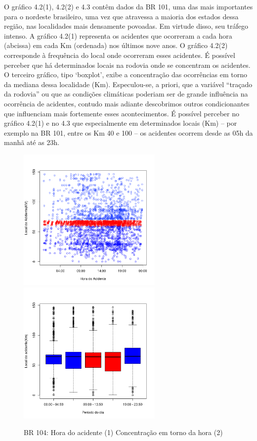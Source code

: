 O gráfico 4.2(1), 4.2(2)  e 4.3 contêm dados da BR 101, uma das mais importantes para o nordeste brasileiro, uma vez que atravessa a maioria dos estados dessa região, nas localidades mais densamente povoadas. Em virtude disso, seu tráfego intenso. 
A gráfico 4.2(1) representa os acidentes que ocorreram a cada hora (abcissa) em cada Km (ordenada) nos últimos nove anos. 
O  gráfico 4.2(2) corresponde à frequência do local onde ocorreram esses acidentes. 
É possível perceber que há determinados locais na rodovia onde se concentram os acidentes. 
O terceiro gráfico, tipo ‘boxplot’, exibe a concentração das ocorrências em torno da mediana dessa localidade (Km). 
Especulou-se, a priori, que a variável “traçado da rodovia” ou que as condições climáticas poderiam ser de grande influência na ocorrência de acidentes, contudo mais adiante descobrimos outros condicionantes que influenciam mais fortemente esses acontecimentos. 
É possível perceber no gráfico 4.2(1) e no 4.3 que especialmente em determinados locais (Km) -- por exemplo na BR 101, entre os Km 40 e 100 -- os acidentes ocorrem desde as 05h da manhã até as 23h. 



\begin{figure}[h]
	\caption{BR 104: Hora do acidente (1) Concentração em torno da hora (2)}
	\includegraphics[width=7cm,height=7cm]{Figuras/Preprocess/br104_12.png}
	\includegraphics[width=7cm,height=7cm]{Figuras/Preprocess/br104_2.png}

\end{figure}

